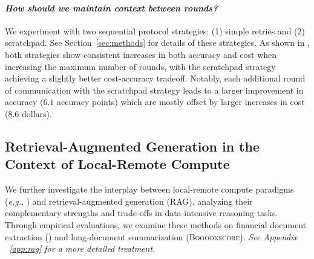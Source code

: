 


\vspace{-1em}\paragraph{\textit{How should we maintain context between \system rounds?}}
We experiment with two sequential protocol strategies: (1) simple retries and (2) scratchpad. 
% 
See Section~\ref{sec:methods} for details of these strategies.
% 
As shown in , both strategies show consistent increases in both accuracy and cost when increasing the maximum number of rounds, with the scratchpad strategy achieving a slightly better cost-accuracy tradeoff. 
% 
Notably, each additional round of communication with the scratchpad strategy leads to a larger improvement in accuracy ($6.1$ accuracy points) which are mostly offset by larger increases in cost ($8.6$ dollars). 




\vspace{-0.5em}\subsection{Retrieval-Augmented Generation in the Context of Local-Remote Compute}
\label{subsec:rag}


We further investigate the interplay between local-remote compute paradigms (\textit{e.g.}, \system) and retrieval-augmented generation (RAG), analyzing their complementary strengths and trade-offs in data-intensive reasoning tasks. Through empirical evaluations, we examine these methods on financial document extraction (\finance) and long-document summarization (\textsc{Booookscore}). \textit{See Appendix ~\ref{app:rag} for a more detailed treatment.}

